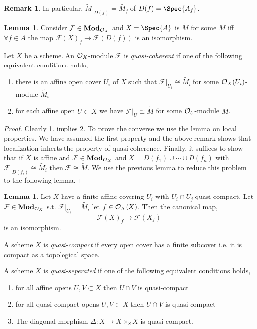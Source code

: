 \documentclass[12pt]{extarticle}
\theoremstyle{definition}
\newtheorem{lemma}[theorem]{Lemma}
\newtheorem{remark}{Remark}
\newenvironment{definition}[1][Definition:]{\begin{trivlist}
\item[\hskip \labelsep {\bfseries #1}]}{\end{trivlist}}
\newcommand{\F}{\mathcal{F}}
\begin{document}
\begin{remark}
In particular, $\widetilde{M}|_{D(f)} = \widetilde{M_f}$ of $D(f) = \Spec{A_f}$. 
\end{remark}

\begin{lemma}
Consider $\F \in \Mod{\struct{X}}$ and $X = \Spec{A}$ is $\widetilde{M}$ for some $M$ iff $\forall f \in A$ the map $\F(X)_f \to \F(D(f))$ is an isomorphism. 
\end{lemma}

\begin{definition}
Let $X$ be a scheme. An $\mathcal{O}_{X}$-module $\F$ is \textit{quasi-coherent} if one of the following equivalent conditions holds,
\begin{enumerate}
\item there is an affine open cover $U_i$ of $X$ such that $\F|_{U_i} \cong \widetilde{M_i}$ for some $\mathcal{O}_{X}(U_i)$-module $\widetilde{M_i}$
\item for each affine open $U \subset X$ we have $\F|_U \cong \widetilde{M}$ for some $\mathcal{O}_{U}$-module $M$. 
\end{enumerate}
\end{definition}

\begin{proof}
Clearly 1. implies 2. To prove the converse we use the lemma on local properties. We have assumed the first property and the above remark shows that localization inherts the property of quasi-coherence. Finally, it suffices to show that if $X$ is affine and $\F \in \Mod{\struct{X}}$ and $X = D(f_1) \cup \cdots \cup D(f_n)$ with $\F|_{D(f_i)} \cong \widetilde{M_i}$ then $\F \cong \widetilde{M}$. We use the previous lemma to reduce this problem to the following lemma. 
\end{proof}

\begin{lemma}
Let $X$ have a finite affine covering $U_i$ with $U_i \cap U_j$ quasi-compact. Let $\F \in \Mod{\struct{X}}$ s.t. $\F |_{U_i} = \widetilde{M_i}$ let $f \in \mathcal{O}_{X}(X)$. Then the canonical map,
\[ \F(X)_f \to \F(X_f) \]
is an isomorphism. 
\end{lemma}

\begin{definition}
A scheme $X$ is \textit{quasi-compact} if every open cover has a finite subcover i.e. it is compact as a topological space.
\end{definition}

\begin{definition}
A scheme $X$ is \textit{quasi-seperated} if one of the following equivalent conditions holds,
\begin{enumerate}
\item for all affine opens $U, V \subset X$ then $U \cap V$ is quasi-compact
\item for all quasi-compact opens $U, V \subset X$ then $U \cap V$ is quasi-compact
\item The diagonal morphism $\Delta : X \to X \times_S X$ is quasi-compact. 
\end{enumerate}
\end{definition}
\end{document}
